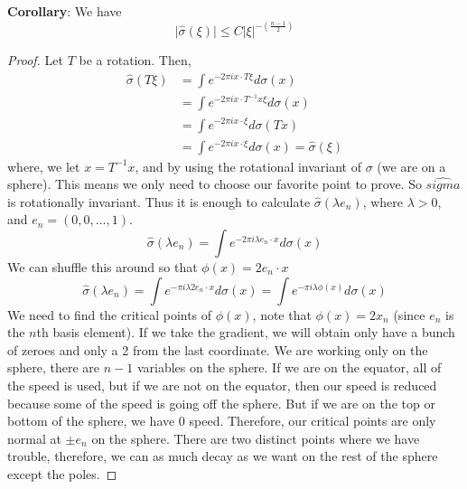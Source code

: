 \documentclass[12pt]{article}
\begin{document}
\noindent \textbf{Corollary}: We have $$\vert \hat{\sigma}(\xi) \vert \leq C \vert \xi \vert^{-(\frac{n-1}{2})}$$
\begin{proof}
Let $T$ be a rotation. Then, 
\begin{align*}
\hat{\sigma}(T \xi) &= \int e^{-2\pi i x \cdot T\xi}d\sigma(x) \\
&= \int e^{-2\pi i x \cdot T^{-1}x\xi}d\sigma(x) \\
&= \int e^{-2\pi i x \cdot\xi}d\sigma(Tx) \\
&= \int e^{-2\pi i x \cdot\xi}d\sigma(x) = \hat{\sigma}(\xi)
\end{align*}
where, we let $x= T^{-1}x$, and by using the rotational invariant of $\sigma$ (we are on a sphere). This means we only need to choose our favorite point to prove. So $\hat{sigma}$ is rotationally invariant. Thus it is enough to calculate $\hat{\sigma}(\lambda e_n)$, where $\lambda>0$, and $e_n = (0,0,\dots, 1)$. 
$$\hat{\sigma}(\lambda e_n) = \int e^{-2\pi i \lambda e_n \cdot x} d\sigma(x)$$
We can shuffle this around so that $\phi(x)=2e_n\cdot x$
$$\hat{\sigma}(\lambda e_n) = \int e^{-\pi i \lambda 2 e_n \cdot x} d\sigma(x) = \int e^{-\pi i \lambda \phi(x)} d\sigma(x)$$
We need to find the critical points of $\phi(x)$, note that $\phi(x)=2x_n$ (since $e_n$ is the $n$th basis element). If we take the gradient, we will obtain only have a bunch of zeroes and only a 2 from the last coordinate. We are working only on the sphere, there are $n-1$ variables on the sphere. If we are on the equator, all of the speed is used, but if we are not on the equator, then our speed is reduced because some of the speed is going off the sphere. But if we are on the top or bottom of the sphere, we have 0 speed. Therefore, our critical points are only normal at $\pm e_n$ on the sphere. There are two distinct points where we have trouble, therefore, we can as much decay as we want on the rest of the sphere except the poles. 
\end{proof}
\end{document}
